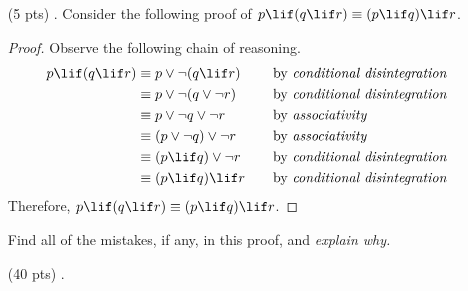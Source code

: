 \begin{enumerate}
  \item[(5 pts) \quad 1.]
    Consider the following proof of $p \lif (q \lif r) \equiv (p \lif q) \lif r$.
    \begin{mdframed}
      \vspace{2ex}
      \begin{proof}
        Observe the following chain of reasoning.
        \begin{align*}
          p \lif (q \lif r)
            &\equiv p \lor \neg(q \lif r)
              &\quad
              &\text{by \emph{conditional disintegration}} \\
            &\equiv p \lor \neg(q \lor \neg r)
              &\quad
              &\text{by \emph{conditional disintegration}} \\
            &\equiv p \lor \neg q \lor \neg r
              &\quad
              &\text{by \emph{associativity}} \\
            &\equiv (p \lor \neg q) \lor \neg r
              &\quad
              &\text{by \emph{associativity}} \\
            &\equiv (p \lif q) \lor \neg r
              &\quad
              &\text{by \emph{conditional disintegration}} \\
            &\equiv (p \lif q) \lif r
              &\quad
              &\text{by \emph{conditional disintegration}}
        \end{align*}
        Therefore, $p \lif (q \lif r) \equiv (p \lif q) \lif r$.
      \end{proof}
    \end{mdframed}
    Find all of the mistakes, if any, in this proof, and \emph{explain why.}
  \item[(40 pts) \quad 2.]

\end{enumerate}
